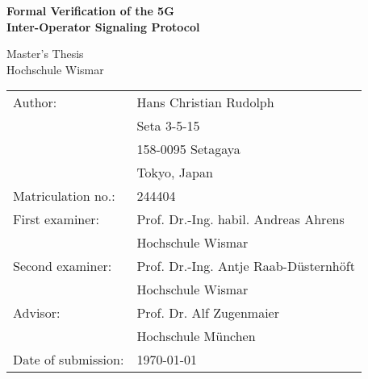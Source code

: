 \begin{titlepage}
\centering

\vspace*{3cm}

{
    \Huge{
        \textbf{Formal Verification of the 5G\\
        \vspace{4mm}
        Inter-Operator Signaling Protocol}
    }
}

\vspace{1cm}

\centering

\LARGE
Master's Thesis\\
Hochschule Wismar

\vspace{2cm}

\vfill
{
    \renewcommand{\arraystretch}{1.1}
    {

    \begin{table}[h!]
    \centering
    \large
    \begin{tabular}{ll}
    Author:             & Hans Christian Rudolph               \\
                        & Seta 3-5-15                          \\
                        & 158-0095 Setagaya                    \\
                        & Tokyo, Japan                         \\
        Matriculation no.:  & 244404                           \vspace{3mm}\\
    First examiner:     & Prof. Dr.-Ing. habil. Andreas Ahrens \\
                        & Hochschule Wismar                    \\
    Second examiner:    & Prof. Dr.-Ing. Antje Raab-Düsternhöft\\
                        & Hochschule Wismar                    \\
    Advisor:            & Prof. Dr. Alf Zugenmaier             \\\vspace{3mm}
                        & Hochschule München                   \\
    Date of submission: & \today
    \end{tabular}
    \end{table}
    }
}

\vspace{2cm}

\end{titlepage}
